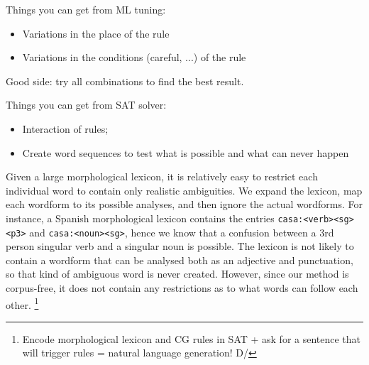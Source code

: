 Things you can get from ML tuning:
\begin{itemize}
\item Variations in the place of the rule
\item Variations in the conditions (careful, ...) of the rule
\end{itemize}
Good side: try all combinations to find the best result.


Things you can get from SAT solver:
\begin{itemize}
\item Interaction of rules; 
\item Create word sequences to test what is possible and what can never happen
\end{itemize}


Given a large morphological lexicon, it is relatively easy to restrict each individual word to contain only realistic ambiguities. We expand the lexicon, map each wordform to its possible analyses, and then ignore the actual wordforms. For instance, a Spanish morphological lexicon contains the entries \texttt{casa:<verb><sg><p3>} and \texttt{casa:<noun><sg>}, hence we know that a confusion between a 3rd person singular verb and a singular noun is possible. The lexicon is not likely to contain a wordform that can be analysed both as an adjective and punctuation, so that kind of ambiguous word is never created.
However, since our method is corpus-free, it does not contain any restrictions as to what words can follow each other. \footnote{Encode morphological lexicon and CG rules in SAT + ask for a sentence that will trigger rules = natural language generation! \:D/}








